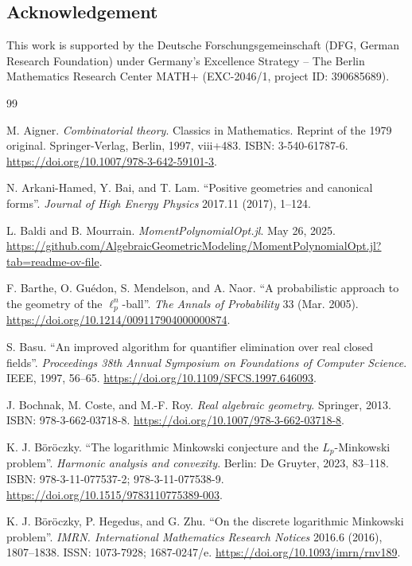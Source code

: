 \documentclass[11pt, a4paper, twoside, reqno]{amsart}
\theoremstyle{definition}
\theoremstyle{remark}
\numberwithin{equation}{section}
\begin{document}
\subsection*{Acknowledgement}

 This work is supported by the Deutsche Forschungsgemeinschaft (DFG, German Research Foundation) under Germany’s Excellence Strategy – The Berlin Mathematics Research Center MATH+ (EXC-2046/1, project ID: 390685689).

\begin{thebibliography}{99}

M. Aigner. \emph{Combinatorial theory}. Classics in Mathematics. Reprint of the 1979 original. Springer-Verlag, Berlin, 1997, viii+483. ISBN: 3-540-61787-6. \url{https://doi.org/10.1007/978-3-642-59101-3}.

N. Arkani-Hamed, Y. Bai, and T. Lam. ``Positive geometries and canonical forms''. \emph{Journal of High Energy Physics} 2017.11 (2017), 1--124.

L. Baldi and B. Mourrain. \emph{MomentPolynomialOpt.jl}. May 26, 2025. \url{https://github.com/AlgebraicGeometricModeling/MomentPolynomialOpt.jl?tab=readme-ov-file}.

F. Barthe, O. Gu\'edon, S. Mendelson, and A. Naor. ``A probabilistic approach to the geometry of the $\ell_p^n$-ball''. \emph{The Annals of Probability} 33 (Mar. 2005). \url{https://doi.org/10.1214/009117904000000874}.

S. Basu. ``An improved algorithm for quantifier elimination over real closed fields''. \emph{Proceedings 38th Annual Symposium on Foundations of Computer Science}. IEEE, 1997, 56--65. \url{https://doi.org/10.1109/SFCS.1997.646093}.

J. Bochnak, M. Coste, and M.-F. Roy. \emph{Real algebraic geometry}. Springer, 2013. ISBN: 978-3-662-03718-8. \url{https://doi.org/10.1007/978-3-662-03718-8}.

K. J. B\"or\"oczky. ``The logarithmic Minkowski conjecture and the $L_p$-Minkowski problem''. \emph{Harmonic analysis and convexity}. Berlin: De Gruyter, 2023, 83--118. ISBN: 978-3-11-077537-2; 978-3-11-077538-9. \url{https://doi.org/10.1515/9783110775389-003}.

K. J. B\"or\"oczky, P. Hegedus, and G. Zhu. ``On the discrete logarithmic Minkowski problem''. \emph{IMRN. International Mathematics Research Notices} 2016.6 (2016), 1807--1838. ISSN: 1073-7928; 1687-0247/e. \url{https://doi.org/10.1093/imrn/rnv189}.


\end{thebibliography}
\end{document}
